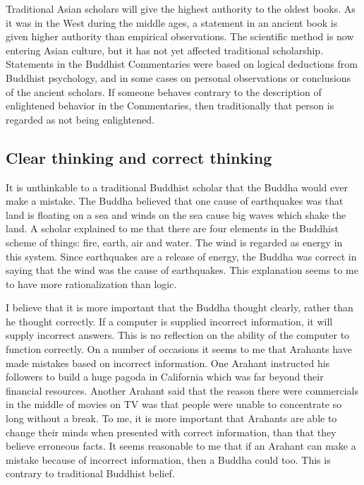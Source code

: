 \documentclass[a5paper,10pt,english]{book}
\begin{document}
\sphinxAtStartPar
Traditional Asian scholars will give the highest authority to the oldest
books. As it was in the West during the middle ages, a statement in an
ancient book is given higher authority than empirical observations. The
scientific method is now entering Asian culture, but it has not yet
affected traditional scholarship. Statements in the Buddhist
Commentaries were based on logical deductions from Buddhist psychology,
and in some cases on personal observations or conclusions of the ancient
scholars. If someone behaves contrary to the description of enlightened
behavior in the Commentaries, then traditionally that person is regarded
as not being enlightened.


\subsection{Clear thinking and correct thinking}
\label{\detokenize{saints:clear-thinking-and-correct-thinking}}
\sphinxAtStartPar
It is unthinkable to a traditional Buddhist scholar that the Buddha
would ever make a mistake. The Buddha believed that one cause of
earthquakes was that land is floating on a sea and winds on the sea
cause big waves which shake the land. A scholar explained to me that
there are four elements in the Buddhist scheme of things: fire, earth,
air and water. The wind is regarded as energy in this system. Since
earthquakes are a release of energy, the Buddha was correct in saying
that the wind was the cause of earthquakes. This explanation seems to me
to have more rationalization than logic.

\sphinxAtStartPar
I believe that it is more important that the Buddha thought clearly,
rather than he thought correctly. If a computer is supplied incorrect
information, it will supply incorrect answers. This is no reflection on
the ability of the computer to function correctly. On a number of
occasions it seems to me that Arahants have made mistakes based on
incorrect information. One Arahant instructed his followers to build a
huge pagoda in California which was far beyond their financial
resources. Another Arahant said that the reason there were commercials
in the middle of movies on TV was that people were unable to concentrate
so long without a break. To me, it is more important that Arahants are
able to change their minds when presented with correct information, than
that they believe erroneous facts. It seems reasonable to me that if an
Arahant can make a mistake because of incorrect information, then a
Buddha could too. This is contrary to traditional Buddhist belief.
\end{document}
